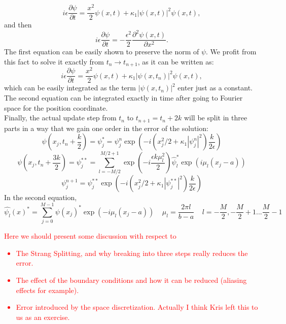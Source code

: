 \documentclass[a4paper,10pt]{article}
\begin{document}
\begin{equation}
i \epsilon \frac{\partial \psi}{\partial t}=\frac{x^2}{2}\psi(x,t)+\kappa_1 |\psi(x,t)|^2\psi(x,t),
\end{equation}
and then 
\begin{equation}
i \epsilon \frac{\partial \psi}{\partial t}=-\frac{\epsilon^2}{2}\frac{\partial^2 \psi(x,t)}{\partial x^2}. 
\end{equation}
The first equation can be easily shown to preserve the norm of $\psi$. We profit from this fact to solve it exactly from $t_n\rightarrow t_{n+1}$, as it can be written as:
\begin{equation}
i \epsilon \frac{\partial \psi}{\partial t}=\frac{x^2}{2}\psi(x,t)+\kappa_1 |\psi(x,t_n)|^2\psi(x,t),
\end{equation}
which can be easily integrated as the term $|\psi(x,t_n)|^2$
enter just as a constant.\\ 
The second equation can be integrated exactly in time after going to Fourier space for the position coordinate. \\
Finally, the actual update step from $t_n$ to $t_{n+1}=t_n+2k$ will be split in three parts in a way that we gain one order in the error of the solution:
\begin{equation}
\psi(x_j,t_{n}+\frac{k}{2})=\psi_j^*=\psi_j^n\exp(-i(x_j^2/2+\kappa_1|\psi_j^n|^2)\frac{k}{2 \epsilon})
\end{equation}
\begin{equation}
\psi(x_j,t_{n}+\frac{3 k}{2})=\psi_j^{**}=\sum_{l=-M/2}^{M/2+1}\exp(-i \frac{\epsilon k \mu_l^2}{2})\hat{\psi}_l^* \exp(i \mu_l (x_j-a))
\end{equation}
\begin{equation}
\psi_j^{n+1}=\psi_j^{**}\exp(-i(x_j^2/2+\kappa_1|\psi_j^{**}|^2)\frac{k}{2 \epsilon})
\end{equation}
In the second equation, 
\begin{equation}
\hat{\psi_{l}}(x)^*=\sum_{j=0}^{M-1} \psi(x_j)^*\exp(-i \mu_l(x_j-a)) \;\;\;\;\mu_l=\frac{2\pi l}{b-a} \;\;\;\;
l=-\frac{M}{2},-\frac{M}{2}+1 ... \frac{M}{2}-1
\end{equation}
\textcolor{red}{Here we should present some discussion with respect to 
\begin{itemize}
 \item The Strang Splitting, and why breaking into three steps really reduces the error.
 \item The effect of the boundary conditions and how it can be reduced (aliasing effects for example).
 \item Error introduced by the space discretization. Actually I think Kris left this to us as an exercise. 
\end{itemize}
}
\end{document}
